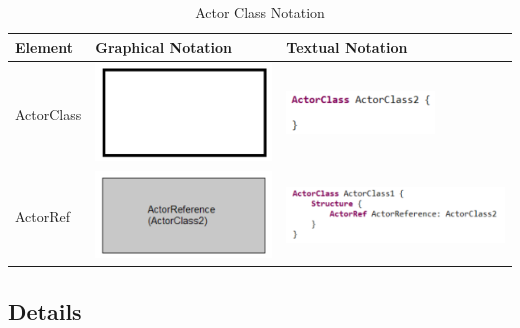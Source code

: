 \begin{table}
\caption{Actor Class Notation}
\begin{tabular}{|l|l|l|}
\hline
 \textbf{Element} & \textbf{Graphical Notation} & \textbf{Textual Notation} \\ \hline
  ActorClass & \includegraphics[scale=0.7]{images/040-ActorClassNotation.png} & 
\includegraphics[scale=0.7]{images/040-ActorClassTextualNotation.png} \\ \hline
  ActorRef & \includegraphics[scale=0.7]{images/040-ActorReferenceNotation.png} & 
\includegraphics[scale=0.7]{images/040-ActorReferenceTextualNotation.png} \\ \hline
\end{tabular}
\end{table}



\subsection{Details}

